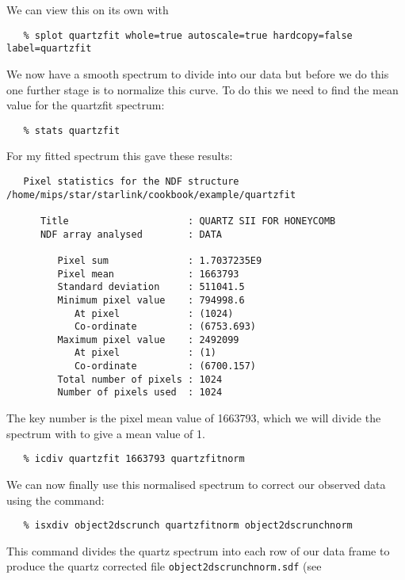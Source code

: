 {{We can view this on its own with 

{\scspec{\small}{ }
\begin{verbatim}
   % splot quartzfit whole=true autoscale=true hardcopy=false label=quartzfit
\end{verbatim}
}

We now have a smooth spectrum to divide into our data but before we do this one further stage is to normalize this curve. To do this we need to find the mean value for the quartzfit spectrum:

{\scspec{\small}{ }
\begin{verbatim}
   % stats quartzfit
\end{verbatim}
}

For my fitted spectrum this gave these results:

{\scspec{\small}{ }
\begin{verbatim}
   Pixel statistics for the NDF structure
/home/mips/star/starlink/cookbook/example/quartzfit

      Title                     : QUARTZ SII FOR HONEYCOMB
      NDF array analysed        : DATA

         Pixel sum              : 1.7037235E9
         Pixel mean             : 1663793
         Standard deviation     : 511041.5
         Minimum pixel value    : 794998.6
            At pixel            : (1024)
            Co-ordinate         : (6753.693)
         Maximum pixel value    : 2492099
            At pixel            : (1)
            Co-ordinate         : (6700.157)
         Total number of pixels : 1024
         Number of pixels used  : 1024 
\end{verbatim}
}

The key number is the pixel mean value of 1663793, which we will divide the spectrum with to give a mean value of 1.

{\scspec{\small}{ }
\begin{verbatim}
   % icdiv quartzfit 1663793 quartzfitnorm
\end{verbatim}
}

We can now finally use this normalised spectrum to correct our observed data using the    command:

{\scspec{\small}{ }
\begin{verbatim}
   % isxdiv object2dscrunch quartzfitnorm object2dscrunchnorm
\end{verbatim}
}

This command divides the quartz spectrum into each row of our data frame to produce the quartz corrected file {\tt object2dscrunchnorm.sdf} (see 

}}
